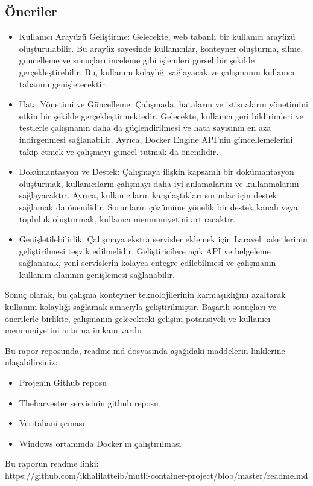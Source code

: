 \subsection*{Öneriler}
\begin{itemize}
    \item Kullanıcı Arayüzü Geliştirme: Gelecekte, web tabanlı bir kullanıcı arayüzü oluşturulabilir. Bu arayüz sayesinde kullanıcılar, konteyner oluşturma, silme, güncelleme ve sonuçları inceleme gibi işlemleri görsel bir şekilde gerçekleştirebilir. Bu, kullanım kolaylığı sağlayacak ve çalışmanın kullanıcı tabanını genişletecektir.
    \item Hata Yönetimi ve Güncelleme: Çalışmada, hataların ve istisnaların yönetimini etkin bir şekilde gerçekleştirmektedir. Gelecekte, kullanıcı geri bildirimleri ve testlerle çalışmanın daha da güçlendirilmesi ve hata sayısının en aza indirgenmesi sağlanabilir. Ayrıca, Docker Engine API'nin güncellemelerini takip etmek ve çalışmayı güncel tutmak da önemlidir.
    \item Dokümantasyon ve Destek: Çalışmaya ilişkin kapsamlı bir dokümantasyon oluşturmak, kullanıcıların çalışmayı daha iyi anlamalarını ve kullanmalarını sağlayacaktır. Ayrıca, kullanıcıların karşılaştıkları sorunlar için destek sağlamak da önemlidir. Sorunların çözümüne yönelik bir destek kanalı veya topluluk oluşturmak, kullanıcı memnuniyetini artıracaktır.
    \item Genişletilebilirlik: Çalışmaya ekstra servisler eklemek için Laravel paketlerinin geliştirilmesi teşvik edilmelidir. Geliştiricilere açık API ve belgeleme sağlanarak, yeni servislerin kolayca entegre edilebilmesi ve çalışmanın kullanım alanının genişlemesi sağlanabilir.
\end{itemize}

Sonuç olarak, bu çalışma konteyner teknolojilerinin karmaşıklığını azaltarak kullanım kolaylığı sağlamak amacıyla geliştirilmiştir. Başarılı sonuçları ve önerilerle birlikte, çalışmanın gelecekteki gelişim potansiyeli ve kullanıcı memnuniyetini artırma imkanı vardır.

Bu rapor reposunda, readme.md dosyasında aşağıdaki maddelerin linklerine ulaşabilirsiniz:
\begin{itemize}
    \item Projenin Github reposu
    \item Theharvester servisinin github reposu
    \item Veritabani şeması
    \item Windows ortamında Docker'ın çalıştırılması
\end{itemize}

Bu raporun readme linki:\\ https://github.com/ikhalilatteib/mutli-container-project/blob/master/readme.md